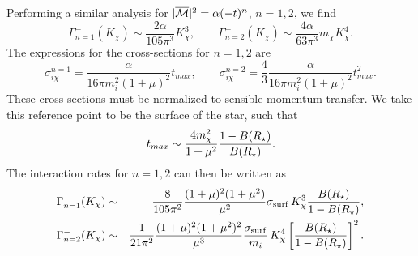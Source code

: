 Performing a similar analysis for $|\overline{\mathcal M}|^2=\alpha (-t)^n$, $n=1,2$, 
we find 
\begin{equation}
\Gamma_{n=1}^{-}(K_\chi) 
\sim \frac{2\alpha }{105\pi^3}K_\chi^3,\qquad 
\Gamma_{n=2}^{-}(K_\chi) 
\sim \frac{4\alpha }{63\pi^3}m_\chi K_\chi^4. 
\end{equation}
The expressions for the cross-sections for $n=1,2$ are 
\begin{equation}
\sigma^{n=1}_{i\chi} = \frac{\alpha}{16\pi m_i^2(1+\mu)^2}t_{max},\qquad
\sigma^{n=2}_{i\chi} = \frac{4}{3}\frac{\alpha}{16\pi m_i^2(1+\mu)^2}t_{max}^2.   
\end{equation}
These cross-sections must be normalized to sensible momentum transfer. We take this reference point to be the surface of the star, such that 
\begin{equation}
      t_{max} \sim \frac{4m_\chi^2}{1+\mu^2}\frac{1-B(R_\star)}{B(R_\star)}.   
\end{equation}
The interaction rates for $n=1,2$ can then be written as
\begin{eqnarray}
    \Gamma_{n=1}^{-}(K_\chi) &\sim& \frac{8}{105 \pi^2} \frac{(1+\mu)^2(1+\mu^2)}{\mu^2} \sigma_{\rm surf} \, K_\chi^3 \frac{B(R_\star)}{1-B(R_\star)}, \label{eq:intraten1}\\
\Gamma_{n=2}^{-}(K_\chi) &\sim& \frac{1}{21 \pi^2} \frac{(1+\mu)^2(1+\mu^2)^2}{\mu^3} \frac{\sigma_{\rm surf}}{m_i} \, K_\chi^4\left[\frac{B(R_\star)}{1-B(R_\star)}\right]^2.
\label{eq:intraten2}
\end{eqnarray}


